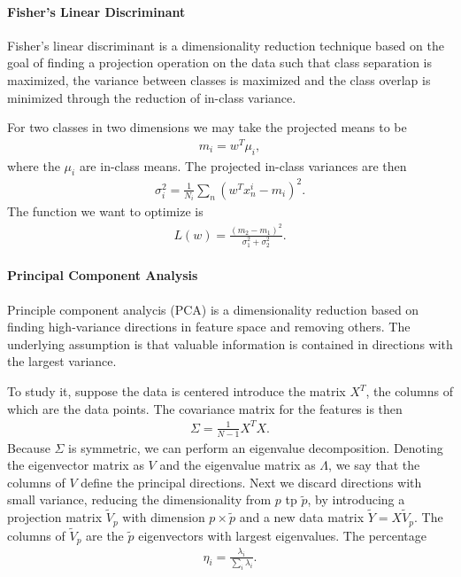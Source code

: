 \paragraph{Fisher's Linear Discriminant}
Fisher's linear discriminant is a dimensionality reduction technique based on the goal of finding a projection operation on the data such that class separation is maximized, the variance between classes is maximized and the class overlap is minimized through the reduction of in-class variance.

For two classes in two dimensions we may take the projected means to be 
\begin{align*}
	m_{i} = w^{T}\mu_{i},
\end{align*}
where the $\mu_{i}$ are in-class means. The projected in-class variances are then
\begin{align*}
	\sigma_{i}^{2} = \frac{1}{N_{i}}\sum\limits_{n}(w^{T}x_{n}^{i} - m_{i})^{2}.
\end{align*}
The function we want to optimize is
\begin{align*}
	L(w) = \frac{(m_{2} - m_{1})^{2}}{\sigma_{1}^{2} + \sigma_{2}^{2}}.
\end{align*}

\paragraph{Principal Component Analysis}
Principle component analycis (PCA) is a dimensionality reduction based on finding high-variance directions in feature space and removing others. The underlying assumption is that valuable information is contained in directions with the largest variance.

To study it, suppose the data is centered introduce the matrix $X^{T}$, the columns of which are the data points. The covariance matrix for the features is then
\begin{align*}
	\Sigma = \frac{1}{N - 1}X^{T}X.
\end{align*}
Because $\Sigma$ is symmetric, we can perform an eigenvalue decomposition. Denoting the eigenvector matrix as $V$ and the eigenvalue matrix as $\Lambda$, we say that the columns of $V$ define the principal directions. Next we discard directions with small variance, reducing the dimensionality from $p$ tp $\tilde{p}$, by introducing a projection matrix $\tilde{V}_{p}$ with dimension $p\times\tilde{p}$ and a new data matrix $\tilde{Y} = X\tilde{V}_{p}$. The columns of $\tilde{V}_{p}$ are the $\tilde{p}$ eigenvectors with largest eigenvalues. The percentage
\begin{align*}
	\eta_{i} = \frac{\lambda_{i}}{\sum\limits_{i}\lambda_{i}}.
\end{align*}

